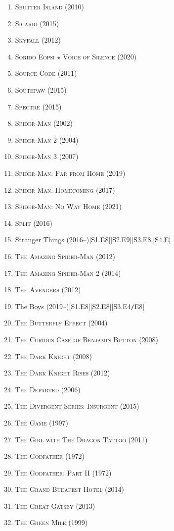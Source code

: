 \documentclass[oneside]{book}
\numberwithin{equation}{section}
\begin{document}
\begin{enumerate}
	\item \textsc{Shutter Island} (2010)
	\item \textsc{Sicario} (2015)
	\item \textsc{Skyfall} (2012)
	\item \textsc{Sorido Eopsi $\star$ Voice of Silence} (2020)
	\item \textsc{Source Code} (2011)
	\item \textsc{Southpaw} (2015)
	\item \textsc{Spectre} (2015)
	\item \textsc{Spider-Man} (2002)
	\item \textsc{Spider-Man 2} (2004)
	\item \textsc{Spider-Man 3} (2007)
	\item \textsc{Spider-Man: Far from Home} (2019)
	\item \textsc{Spider-Man: Homecoming} (2017)
	\item \textsc{Spider-Man: No Way Home} (2021)
	\item \textsc{Split} (2016)
	\item Stranger Things (2016--)\hfill[S1.E8][S2.E9][S3.E8][S4.E]
	\item \textsc{The Amazing Spider-Man} (2012)
	\item \textsc{The Amazing Spider-Man 2} (2014)
	\item \textsc{The Avengers} (2012)
	\item The Boys (2019--)\hfill[S1.E8][S2.E8][S3.E4\texttt{/}E8]
	\item \textsc{The Butterfly Effect} (2004)
	\item \textsc{The Curious Case of Benjamin Button} (2008)
	\item \textsc{The Dark Knight} (2008)
	\item \textsc{The Dark Knight Rises} (2012)
	\item \textsc{The Departed} (2006)
	\item \textsc{The Divergent Series: Insurgent} (2015)
	\item \textsc{The Game} (1997)
	\item \textsc{The Girl with The Dragon Tattoo} (2011)
	\item \textsc{The Godfather} (1972)
	\item \textsc{The Godfather: Part II} (1972)
	\item \textsc{The Grand Budapest Hotel} (2014)
	\item \textsc{The Great Gatsby} (2013)
	\item \textsc{The Green Mile} (1999)

\end{enumerate}
\end{document}
